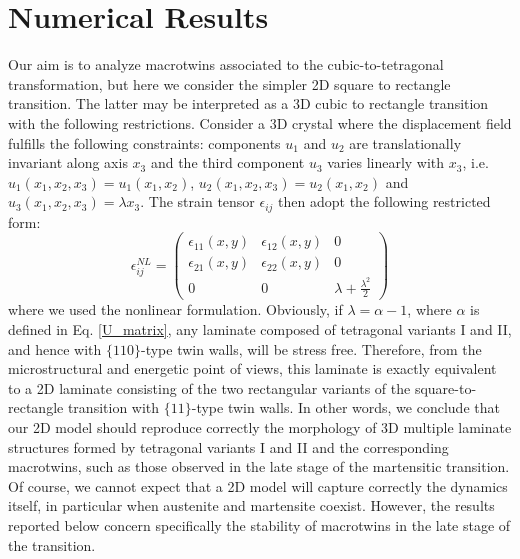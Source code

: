 \documentclass[twocolumn,amsmath,amssymb]{revtex4}
\begin{document}
\section{\label{sec:level2}Numerical Results}
Our aim is to analyze macrotwins associated to the cubic-to-tetragonal transformation, but here we consider the simpler 2D square to rectangle transition. The latter may be interpreted as a 3D cubic to rectangle transition with the following restrictions. Consider a 3D crystal where the displacement field fulfills the following constraints: components $u_1$ and $u_2$ are translationally invariant along axis $x_3$ and the third component $u_3$ varies linearly with $x_3$, i.e. $u_1(x_1,x_2,x_3)=u_1(x_1,x_2)$, $u_2(x_1,x_2,x_3)=u_2(x_1,x_2)$ and $u_3(x_1,x_2,x_3)=\lambda x_3$.  The strain tensor $\epsilon_{ij}$ then adopt the following restricted form:
%
\begin{equation}
\epsilon_{ij}^{NL}=\left(
\begin{matrix}
\epsilon_{11}(x,y)   & \epsilon_{12}(x,y) & 0 \\
\epsilon_{21}(x,y)   & \epsilon_{22}(x,y) & 0 \\
0 & 0  & \lambda+\frac{\lambda^2}{2}
\end{matrix}\right)
\end{equation} 
%
where we used the nonlinear formulation. Obviously, if $\lambda = \alpha-1$, where $\alpha$ is defined in Eq. \ref{U_matrix}, any laminate composed of tetragonal variants I and II, and hence with $\{110\}$-type twin walls,  will be stress free. Therefore, from the microstructural and energetic point of views, this laminate is exactly equivalent to a 2D laminate consisting of the two rectangular variants of the square-to-rectangle transition with $\{11\}$-type twin walls. In other words, we conclude that our 2D model should reproduce correctly the morphology of 3D multiple laminate structures formed by tetragonal variants I and II and the corresponding macrotwins, such as those observed in the late stage of the martensitic transition. Of course, we cannot expect that a 2D model will capture correctly the dynamics itself, in particular when austenite and martensite coexist. However, the results reported below concern specifically the stability of macrotwins in the late stage of the transition.
\end{document}
